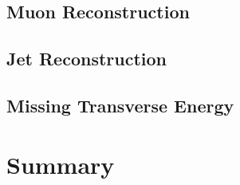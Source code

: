 \subsection{Muon Reconstruction}

\subsection{Jet Reconstruction}

\subsection{Missing Transverse Energy}

\section{Summary}


